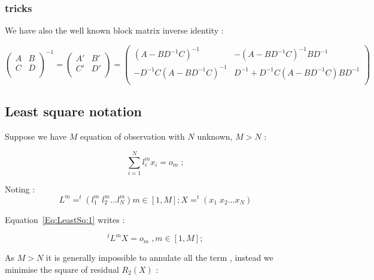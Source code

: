 \subsubsection{tricks}
We have also the well known block matrix inverse identity :

\begin{equation}
\left( \begin{array}{cc} 
              A & B \\ 
              C  & D\\ 
        \end{array} 
\right) ^{-1}
= 
\left( \begin{array}{cc} 
              A' & B' \\ 
              C'  & D'\\ 
        \end{array} 
\right) 
= 
\left( \begin{array}{cc} 
              (A-BD^{-1}C)^{-1} & -(A-BD^{-1}C)^{-1} BD^{-1} \\ 
              -D^{-1}C(A-BD^{-1}C)^{-1}  &  D^{-1}+D^{-1}C(A-BD^{-1}C) BD^{-1}\\ 
        \end{array} 
\right) 
\label{Eq:BlockInv}
\end{equation}



\subsection{Least square notation}

Suppose we have $M$ equation of observation with $N$ unknown, $M>N$ :

\begin{equation}
    \sum\limits_{i=1}^N l_i^ m x_i = o_m \; ; \label{Eq:LeastSq:1}
\end{equation}

Noting :
\begin{equation}
    L^m = ^t (l_1^m \;  l_2^m \dots l_N^m)  m \in [1,M] ;  X= ^t (x_1 \; x_2 \dots x_N) 
\end{equation}

Equation~\ref{Eq:LeastSq:1} writes :

\begin{equation}
     ^t L^m  X  = o_m \; ,  m \in [1,M] ;
\end{equation}


As $M>N$ it is generally impossible to annulate all the term , instead we minimise the square of residual $R_2(X)$  :

